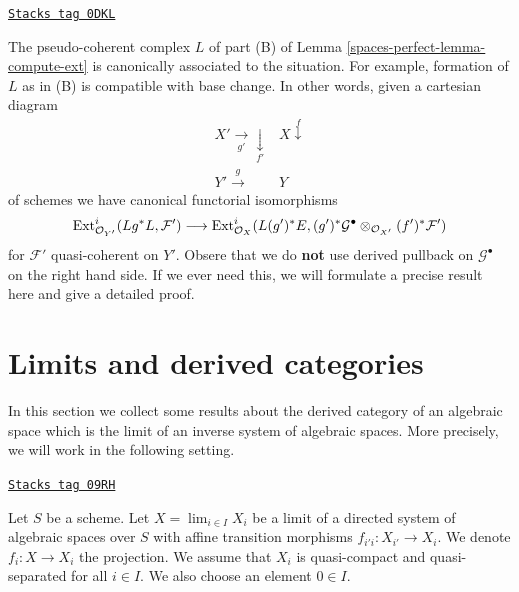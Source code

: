 \begin{remark}
\label{spaces-perfect-remark-base-change-of-L}
\href{https://stacks.math.columbia.edu/tag/0DKL}{\texttt{Stacks tag 0DKL}}

The pseudo-coherent complex $L$ of part (B) of Lemma \ref{spaces-perfect-lemma-compute-ext}
is canonically associated to the situation. For example,
formation of $L$ as in (B) is compatible with base change.
In other words, given a cartesian diagram
$$
\begin{array}{cc}X' \underset{g'}{\longrightarrow}\underset{f'}{\downarrow} & X \overset{f}{\downarrow} \\ Y' \overset{g}{\longrightarrow} & Y\end{array}
$$
of schemes we have canonical functorial isomorphisms
$$
\operatorname{Ext}^i_{\mathcal{O}_{Y'}}(Lg^*L, \mathcal{F}') \longrightarrow
\operatorname{Ext}^i_{\mathcal{O}_X}(L(g')^*E,
(g')^*\mathcal{G}^\bullet \otimes_{\mathcal{O}_{X'}} (f')^*\mathcal{F}')
$$
for $\mathcal{F}'$ quasi-coherent on $Y'$. Obsere that we do {\bf not} use
derived pullback on $\mathcal{G}^\bullet$ on the right hand side.
If we ever need this, we will
formulate a precise result here and give a detailed proof.
\end{remark}

\section{Limits and derived categories}
\label{spaces-perfect-section-limits}
In this section we collect some results about the derived category
of an algebraic space which is the limit of an inverse system of
algebraic spaces. More precisely, we will work in the following setting.

\begin{definition}
\label{spaces-perfect-situation-descent}
\href{https://stacks.math.columbia.edu/tag/09RH}{\texttt{Stacks tag 09RH}}

Let $S$ be a scheme. Let $X = \lim_{i \in I} X_i$ be a limit of a directed
system of algebraic spaces over $S$ with affine transition morphisms
$f_{i'i} : X_{i'} \to X_i$. We denote $f_i : X \to X_i$ the projection.
We assume that $X_i$ is quasi-compact and quasi-separated for all $i \in I$.
We also choose an element $0 \in I$.
\end{definition}

